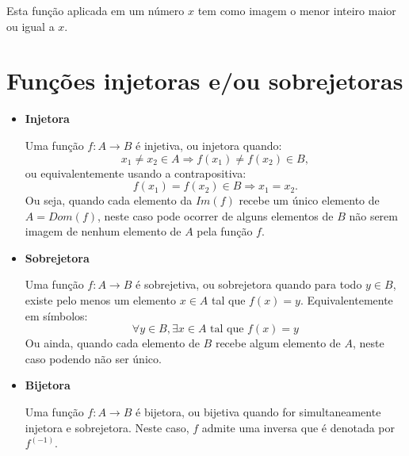   Esta função aplicada em um número $x$ tem como imagem o menor inteiro maior ou igual a $x$.

\newpage
\section{Funções injetoras e/ou sobrejetoras}

\begin{itemize}
 \item \textbf{Injetora}

 Uma função $f: A \rightarrow B$ é injetiva, ou injetora quando:
\begin{equation}
 x_1 \neq x_2 \in A \Rightarrow f(x_1) \neq f(x_2) \in B ,
\end{equation}
 ou equivalentemente usando a contrapositiva:
\begin{equation}
f(x_1) = f(x_2) \in B \Rightarrow x_1 = x_2 .
\end{equation}
 Ou seja, quando cada elemento da $Im(f)$ recebe um único elemento de $A= Dom(f)$, neste caso pode ocorrer de alguns elementos de $B$ não serem imagem de nenhum elemento de $A$ pela função $f$.

 \item \textbf{Sobrejetora}

 Uma função $f: A \rightarrow B$ é sobrejetiva, ou sobrejetora quando para todo $y \in B$, existe pelo menos um elemento $x \in A$ tal que $f(x) = y$. Equivalentemente em símbolos:
\begin{equation}
\forall y \in B, \exists x \in A \text{ tal que } f(x) = y
\end{equation}
 Ou ainda, quando cada elemento de $B$ recebe algum elemento de $A$, neste caso podendo não ser único.

 \item \textbf{Bijetora}

 Uma função $f: A \rightarrow B$ é bijetora, ou bijetiva quando for simultaneamente injetora e sobrejetora. Neste caso, $f$ admite uma inversa que é denotada por $f^{(-1)}$.

\end{itemize}

